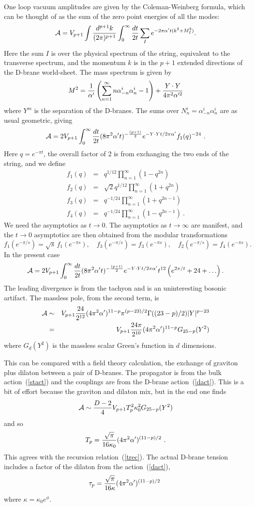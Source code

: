 \documentclass[12pt]{article}
\def\be{\begin{equation}}
\def\ee{\end{equation}}
\def\bea{\begin{eqnarray}}
\def\eea{\end{eqnarray}}
\def\ap{\alpha'}
\begin{document}
One loop vacuum amplitudes are given by the Coleman-Weinberg
formula, which can be thought of as the sum of the zero point
energies of all the modes:\cite{cw}
\be
{\cal A} = V_{p+1}\int \frac{d^{p+1}k}{(2\pi)^{p+1}}\int_0^\infty {dt \over
2t} \sum_{I} e^{-2\pi \ap t (k^2 + M_I^2)} .
\ee
Here the sum $I$ is over the physical spectrum of the string, equivalent
to the transverse spectrum, and the momentum $k$ is in
the $p+1$ extended directions of the D-brane world-sheet.
The mass spectrum is given by
\be
M^2={1\over\ap}\left(\sum_{n=1}^\infty
n{\alpha}^i_{-n}\alpha_n^i-1\right)+{Y \cdot Y\over4\pi^2
\alpha^{\prime 2}}
\ee
where $Y^m$ is the separation of the D-branes.
The sums over $N_n^i = {\alpha}^i_{-n}\alpha_n^i$ are as usual
geometric, giving
\be
{\cal A}=2V_{p+1} \int_0^\infty {dt\over 2t} (8\pi^2 \ap t)^{-{(p+1)\over2}}
e^{-Y \cdot Y t/ 2\pi\ap} f_1(q)^{-24}\ .
\ee
Here $q=e^{-\pi t}$, the overall factor of 2 is from exchanging the
two ends of the string, and we define
\bea
f_1(q) &=& q^{1/12} \prod_{n=1}^{\infty} (1-q^{2n})
\nonumber\\
f_2(q) &=& \sqrt{2} q^{1/12} \prod_{n=1}^{\infty} (1+q^{2n})
\nonumber\\
f_3(q) &=& q^{-1/24} \prod_{n=1}^{\infty} (1+q^{2n-1})
\nonumber\\
f_4(q) &=& q^{-1/24} \prod_{n=1}^{\infty} (1-q^{2n-1})\ .
\eea  
We need the asymptotics as $t \to
0$.  The asymptotics as $t\to \infty$ are manifest, and the
$t\to 0$ asymptotics are then obtained from the modular transformations
\be
f_{1}(e^{-{\pi}/{s}}) = \sqrt{s}\,f_{1}(e^{-\pi s}),\quad
f_{3}(e^{-{\pi}/{s}}) = f_{3}(e^{-\pi s}),\quad
f_{2}(e^{-{\pi}/{s}}) = f_{4}(e^{-\pi s}) . 
\ee
In the present case
\be
{\cal A}=
2 V_{p+1} \int_0^\infty {dt\over 2t} (8\pi^2 \ap t)^{-{(p+1)\over2}}
e^{-Y \cdot Y t/ 2\pi\ap} t^{12} \left( e^{2\pi/t} + 24 + \ldots
\right).  \label{cpoles}
\ee
The leading divergence is from the tachyon and is an uninteresting bosonic
artifact.  The massless pole, from the second term, is
\bea
{\cal A} &\sim& V_{p+1}{24\over 2^{12}} (4\pi^2\ap)^{11-p}
\pi^{(p-23)/2} \Gamma((23 - p)/2) |Y|^{p-23} \nonumber\\
& =& V_{p+1} {24 \pi\over 2^{10}} (4\pi^2\ap)^{11-p}
G_{25-p}(Y^2)
\eea
where $G_d(Y^2)$ is the massless scalar Green's function in $d$ dimensions.

This can be compared with a field theory calculation, the exchange of
graviton plus dilaton between a pair of D-branes.  The propagator is from
the bulk action~(\ref{stact}) and the couplings are from the D-brane
action~(\ref{dact}).  This is a bit of effort because the graviton and
dilaton mix, but in the end one finds
\be
{\cal A} \sim {D-2 \over 4} V_{p+1} T_p^2 \kappa_0^2
 G_{25-p}(Y^2) \label{fieldpole}
\ee
and so
\be
T_p = {\sqrt{\pi}\over 16 \kappa_0} (4\pi^2\ap)^{(11-p)/2}\ .
\ee
This agrees with the recursion relation~(\ref{trec}).
The actual D-brane tension includes a factor of the dilaton from the
action~(\ref{dact}),
\be
\tau_p = {\sqrt{\pi}\over 16 \kappa} (4\pi^2\ap)^{(11-p)/2}\ 
\ee
where $\kappa = \kappa_0 e^\phi$.
\end{document}
